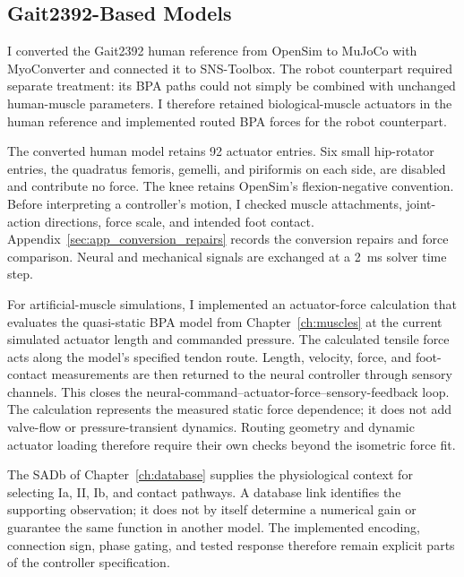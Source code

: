 \FloatBarrier

\subsection{Gait2392-Based Models}\label{sec:sns_existing_tools}\label{sec:sns_gait_comparison_main}

I converted the Gait2392 human reference from OpenSim to MuJoCo with MyoConverter and connected it to SNS-Toolbox. The robot counterpart required separate treatment: its BPA paths could not simply be combined with unchanged human-muscle parameters. I therefore retained biological-muscle actuators in the human reference and implemented routed BPA forces for the robot counterpart.

The converted human model retains 92 actuator entries. Six small hip-rotator entries, the quadratus femoris, gemelli, and piriformis on each side, are disabled and contribute no force. The knee retains OpenSim's flexion-negative convention. Before interpreting a controller's motion, I checked muscle attachments, joint-action directions, force scale, and intended foot contact. Appendix~\ref{sec:app_conversion_repairs} records the conversion repairs and force comparison. Neural and mechanical signals are exchanged at a \qty{2}{\milli\second} solver time step.

For artificial-muscle simulations, I implemented an actuator-force calculation that evaluates the quasi-static BPA model from Chapter~\ref{ch:muscles} at the current simulated actuator length and commanded pressure. The calculated tensile force acts along the model's specified tendon route. Length, velocity, force, and foot-contact measurements are then returned to the neural controller through sensory channels. This closes the neural-command--actuator-force--sensory-feedback loop. The calculation represents the measured static force dependence; it does not add valve-flow or pressure-transient dynamics. Routing geometry and dynamic actuator loading therefore require their own checks beyond the isometric force fit.

The SADb of Chapter~\ref{ch:database} supplies the physiological context for selecting Ia, II, Ib, and contact pathways. A database link identifies the supporting observation; it does not by itself determine a numerical gain or guarantee the same function in another model. The implemented encoding, connection sign, phase gating, and tested response therefore remain explicit parts of the controller specification.

